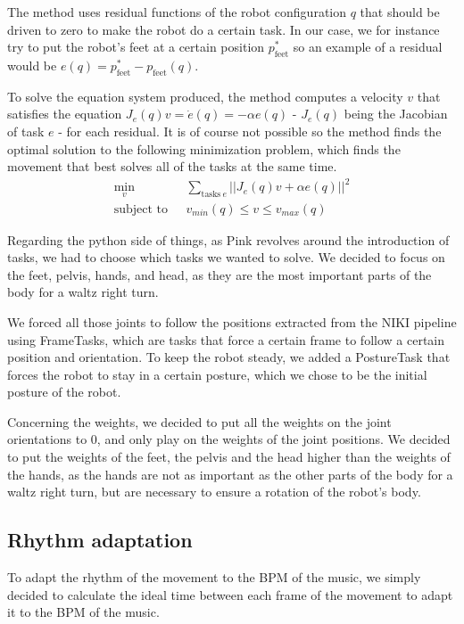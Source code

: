 \documentclass{amsart}
\theoremstyle{definition}
\theoremstyle{plain}
\begin{document}
The method uses residual functions of the robot configuration $q$ that should be driven to zero to make the robot do a certain task. 
In our case, we for instance try to put the robot's feet at a certain position $p_{\text{feet}}^*$ so an example of a residual would be $e(q) = p_{\text{feet}}^* - p_{\text{feet}}(q)$. 

To solve the equation system produced, the method computes a velocity $v$ that satisfies the equation $J_e(q)v = \dot{e}(q) = -\alpha e(q)$ - $J_e(q)$ being the Jacobian of task $e$ - for each residual. 
It is of course not possible so the method finds the optimal solution to the following minimization problem, which finds the movement that best solves all of the tasks at the same time.
$$
\begin{aligned}
\min_v \ \ &\sum_{\text{tasks} \ e} ||J_e(q)v + \alpha e(q)||^2 \\
\text{subject to} \ \ \ &v_{min}(q) \leq v \leq v_{max}(q)
\end{aligned}
$$

Regarding the python side of things, as Pink revolves around the introduction of tasks, we had to choose which tasks we wanted to solve. 
We decided to focus on the feet, pelvis, hands, and head, as they are the most important parts of the body for a waltz right turn. 

We forced all those joints to follow the positions extracted from the NIKI pipeline using FrameTasks, which are tasks that force a certain frame to follow a certain position and orientation. 
To keep the robot steady, we added a PostureTask that forces the robot to stay in a certain posture, which we chose to be the initial posture of the robot.

Concerning the weights, we decided to put all the weights on the joint orientations to 0, and only play on the weights of the joint positions. 
We decided to put the weights of the feet, the pelvis and the head higher than the weights of the hands, as the hands are not as important as the other parts of the body for a waltz right turn, but are necessary to ensure a rotation of the robot's body.

\subsection{Rhythm adaptation}

To adapt the rhythm of the movement to the BPM of the music, we simply decided to calculate the ideal time between each frame of the movement to adapt it to the BPM of the music. 
\end{document}
